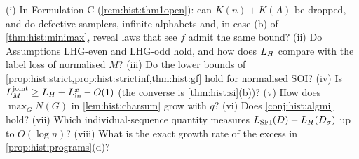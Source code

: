 \begin{question}\label{q:hist:open}
(i) In Formulation C (\cref{rem:hist:thm1open}): can $K(n)+K(A)$ be dropped, and do defective samplers, infinite alphabets and, in case (b) of \cref{thm:hist:minimax}, reveal laws that see $f$ admit the same bound? (ii) Do Assumptions LHG-even and LHG-odd hold, and how does $L_{H}$ compare with the label loss of normalised $M$? (iii) Do the lower bounds of \cref{prop:hist:strict,prop:hist:strictinf,thm:hist:gf} hold for normalised SOI? (iv) Is $L_{M}^{\mathrm{joint}}\ge L_{H}+L^x_{\rm in}-O(1)$ (the converse is \cref{thm:hist:si}(b))? (v) How does $\max_GN(G)$ in \cref{lem:hist:charsum} grow with $q$? (vi) Does \cref{conj:hist:algmi} hold? (vii) Which individual-sequence quantity measures $L_{\mathrm{SFI}}(D)-L_{H}(D_\sigma)$ up to $O(\log n)$? (viii) What is the exact growth rate of the excess in \cref{prop:hist:programs}(d)?
\end{question}
